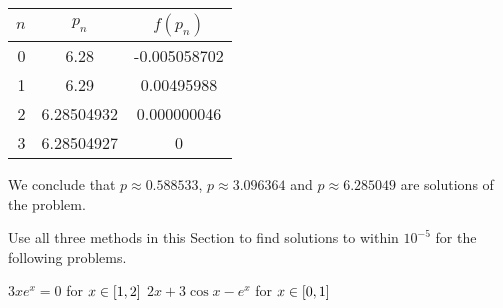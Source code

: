 \documentclass[../../../../Assignments]{subfiles}
\begin{document}
\begin{solution}
\begin{enumerate}[label = \alph*)]
            \begin{table}[H]
                \centering
                \begin{tabular}{r S[table-format=1.8] S[table-format=-1.9]}
                    \toprule
                    \(n\)  &   {\(p_n\)}   &  {\(f(p_n)\)}  \\
                      &  6.28         &  -0.005058702  \\
                        1  &  6.29         &   0.00495988   \\
                        2  &  6.28504932   &   0.000000046  \\
                        3  &  6.28504927   &   0            \\
                    \bottomrule
                \end{tabular}
            \end{table}

            We conclude that \(p \approx \num{0.588533}\), \(p \approx
            \num{3.096364}\) and \(p \approx \num{6.285049}\) are solutions of
            the problem.
    \end{enumerate}
\end{solution}

\begin{exercise}
    Use all three methods in this Section to find solutions to within
    \(10^{-5}\) for the following problems.

    \begin{tasks}
        \task \(3xe^x = 0\) for \(x \in \interval{1}{2}\)
        \task \(2x + 3 \cos{x} - e^x\) for \(x \in \interval{0}{1}\)
    \end{tasks}
\end{exercise}
\end{document}
